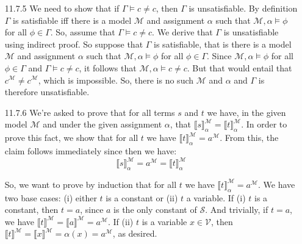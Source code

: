\begin{itemize}
                    \item[11.7.5]We need to show that if $\Gamma\vDash
                      c\neq c$, then $\Gamma$ is unsatisfiable. By
                      definition $\Gamma$ is satisfiable iff there is
                      a model $\mathcal{M}$ and assignment $\alpha$
                      such that $\mathcal{M},\alpha\vDash \phi$ for
                      all $\phi\in\Gamma$. So, assume that $\Gamma\vDash
                      c\neq c$. We derive that $\Gamma$ is
                      unsatisfiable using indirect proof. So suppose
                      that $\Gamma$ is satisfiable, that is there is
                      a model $\mathcal{M}$ and assignment $\alpha$
                      such that $\mathcal{M},\alpha\vDash \phi$ for
                      all $\phi\in\Gamma$. Since $\mathcal{M},\alpha\vDash \phi$ for
                      all $\phi\in\Gamma$ and $\Gamma\vDash c\neq c$,
                      it follows that $\mathcal{M},\alpha\vDash c\neq
                      c$. But that would entail that
                      $c^\mathcal{M}\neq c^\mathcal{M}$, which is
                      impossible. So, there is no such $\mathcal{M}$
                      and $\alpha$ and $\Gamma$ is therefore unsatisfiable.

                  \item[11.7.6] We're asked to prove that for all
                    terms $s$ and $t$ we have, in the given model
                    $\mathcal{M}$ and under the given assignment
                    $\alpha$, that $\llbracket
                    s\rrbracket^\mathcal{M}_\alpha=\llbracket
                    t\rrbracket^\mathcal{M}_\alpha$. In order to prove
                    this fact, we show that for all $t$ we have $\llbracket
                    t\rrbracket^\mathcal{M}_\alpha=a^\mathcal{M}$. From
                    this, the claim follows immediately since then we
                    have: \[\llbracket
                    s\rrbracket^\mathcal{M}_\alpha=a^\mathcal{M}=\llbracket
                    t\rrbracket^\mathcal{M}_\alpha\]

                    So, we want to prove by induction that for all $t$ we have $\llbracket
                    t\rrbracket^\mathcal{M}_\alpha=a^\mathcal{M}$. We
                    have two base cases: (i) either $t$ is a constant
                    or (ii) $t$ a variable. If (i) $t$ is a constant, then
                    $t=a$, since $a$ is the only constant of
                    $\mathcal{S}$. And trivially, if $t=a$,  we have
                    $\llbracket t\rrbracket^\mathcal{M}=\llbracket
                    a\rrbracket^\mathcal{M}=a^\mathcal{M}$. If (ii)
                    $t$ is a variable $x\in \mathcal{V}$, then
                    $\llbracket t\rrbracket^\mathcal{M}=\llbracket
                    x\rrbracket^\mathcal{M}=\alpha(x)=a^\mathcal{M}$,
                    as desired.


\end{itemize}
